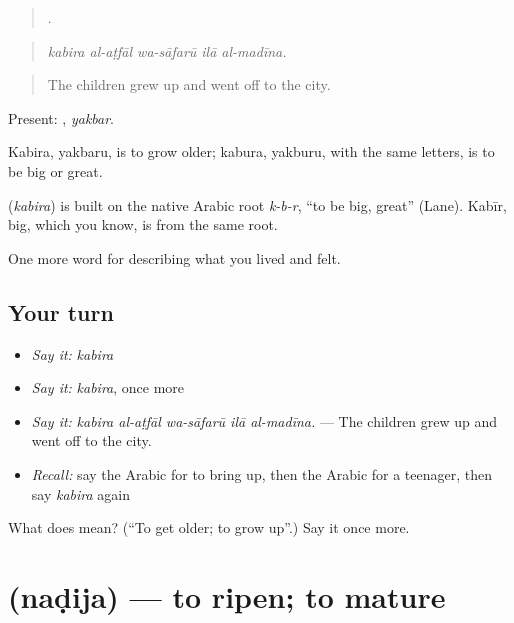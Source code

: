 \begin{quote}
    .
\end{quote}

\begin{quote}
\emph{kabira al-aṭfāl wa-sāfarū ilā al-madīna.}
\end{quote}

\begin{quote}
The children grew up and went off to the city.
\end{quote}

Present: , \emph{yakbar}.

Kabira, yakbaru, is to grow older; kabura, yakburu, with the same letters, is to be big or great.

\begin{cousinweb}
\textbf{} (\emph{kabira}) is built on the native Arabic root \emph{k-b-r}, \textquotedblleft{}to be big, great\textquotedblright{} (Lane). Kabīr, big, which you know, is from the same root.
\end{cousinweb}

\begin{grammarlens}[title={What you've built}]
One more word for describing what you lived and felt.
\end{grammarlens}

\subsection*{Your turn}
\begin{itemize}
\raggedright
  \item \emph{Say it:} \emph{kabira}
  \item \emph{Say it:} \emph{kabira}, once more
  \item \emph{Say it:} \emph{kabira al-aṭfāl wa-sāfarū ilā al-madīna.} — The children grew up and went off to the city.
  \item \emph{Recall:} say the Arabic for to bring up, then the Arabic for a teenager, then say \emph{kabira} again
\end{itemize}

\begin{tcolorbox}[breakable,colback=teal!4,colframe=teal!35!black,title={Before you move on}]
What does  mean? (\textquotedblleft{}To get older; to grow up\textquotedblright{}.) Say it once more.
\end{tcolorbox}
\section[\texorpdfstring{\ar{نضج} (naḍija)}{نضج (naḍija)}]{ (naḍija) — to ripen; to mature}

